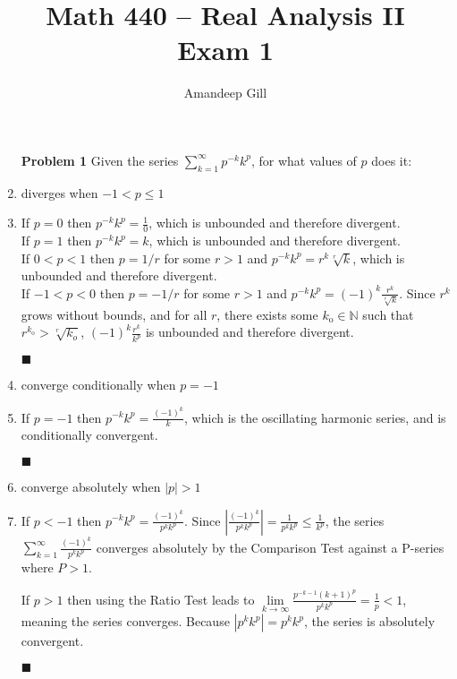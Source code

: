 \documentclass[a4paper,12pt]{report}
\newcommand{\bb}[1]{\mathbb{#1}}
\newcommand{\naught}[1]{{#1}_{\text{o}}}
\newcommand{\problem}[3]{
	\begin{enumerate}
		\item[\bf{Problem #1}] #2 
		#3
	\end{enumerate}
}
\newcommand{\subproof}[3]{
	\item[#1] #2
	\item[\bf{Proof:}] 
	#3 
	\begin{flushright}
		$\blacksquare$
	\end{flushright}
}
\begin{document}
\title{Math 440 -- Real Analysis II \\ \vspace{7px} \large{Exam 1}}
\author{Amandeep Gill}
\maketitle

\problem{1}{
	Given the series $\sum\limits_{k=1}^{\infty}p^{-k}k^p$, for what values of $p$ does it:
}{
	\subproof{(a)}{
		diverges when $-1 < p \leqslant 1$
	}{
		If $p = 0$ then $p^{-k}k^p = \frac{1}{0}$, which is unbounded and therefore divergent. \\
		If $p = 1$ then $p^{-k}k^p = k$, which is unbounded and therefore divergent. \\
		If $0 < p < 1$ then $p = 1/r$ for some $r > 1$ and $p^{-k}k^p = r^k \sqrt[r]{k}$, which is unbounded and therefore divergent. \\
		If $-1 < p < 0$ then $p = -1/r$ for some $r > 1$ and $p^{-k}k^p = (-1)^k \frac{r^k}{\sqrt[r]{k}}$. Since $r^k$ grows without bounds, and for all $r$, there exists some $\naught{k} \in \bb{N}$ such that $r^{\naught{k}} > \sqrt[r]{k_o}$, $(-1)^{k}\frac{r^{k}}{k^p}$ is unbounded and therefore divergent.
	}
	
	\subproof{(b)}{
		converge conditionally when $p = -1$
	}{
		If $p = -1$ then $p^{-k}k^p = \frac{(-1)^k}{k}$, which is the oscillating harmonic series, and is conditionally convergent.
	}
	
	\subproof{(c)}{
		converge absolutely when $|p| > 1$
	}{
		If $p < -1$ then $p^{-k}k^p = \frac{(-1)^k}{p^k k^p}$. Since $\left|\frac{(-1)^k}{p^k k^p}\right| = \frac{1}{p^k k^p} \leqslant \frac{1}{k^p}$, the series $\sum\limits_{k=1}^{\infty}\frac{(-1)^k}{p^k k^p}$ converges absolutely by the Comparison Test against a P-series where $P > 1$.
		
		If $p > 1$ then using the Ratio Test leads to $\lim\limits_{k \to \infty}\frac{p^{-k-1}(k+1)^p}{p^k k^p} = \frac{1}{p} < 1$, meaning the series converges. Because $|p^k k^p| = p^k k^p$, the series is absolutely convergent.
	}
}

\pagebreak
\end{document}
